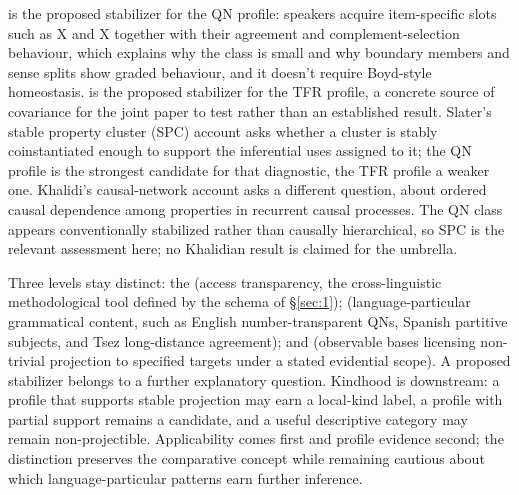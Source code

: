 is the proposed stabilizer for the QN profile: speakers acquire item-specific slots such as  X and  X together with their agreement and complement-selection behaviour, which explains why the class is small and why boundary members and sense splits show graded behaviour, and it doesn't require Boyd-style homeostasis.  is the proposed stabilizer for the TFR profile, a concrete source of covariance for the joint paper to test rather than an established result. Slater's \autocite*{slater-2015-natural-kindness} stable property cluster (SPC) account asks whether a cluster is stably coinstantiated enough to support the inferential uses assigned to it; the QN profile is the strongest candidate for that diagnostic, the TFR profile a weaker one. Khalidi's \autocite*{khalidi-2018-causal-networks} causal-network account asks a different question, about ordered causal dependence among properties in recurrent causal processes. The QN class appears conventionally stabilized rather than causally hierarchical, so SPC is the relevant assessment here; no Khalidian result is claimed for the umbrella.

Three levels stay distinct: the  (access transparency, the cross-linguistic methodological tool defined by the schema of §\ref{sec:1});  (language-particular grammatical content, such as English number-transparent QNs, Spanish partitive subjects, and Tsez long-distance agreement); and  (observable bases licensing non-trivial projection to specified targets under a stated evidential scope). A proposed stabilizer belongs to a further explanatory question. Kindhood is downstream: a profile that supports stable projection may earn a local-kind label, a profile with partial support remains a candidate, and a useful descriptive category may remain non-projectible. Applicability comes first and profile evidence second; the distinction preserves the comparative concept while remaining cautious about which language-particular patterns earn further inference.
